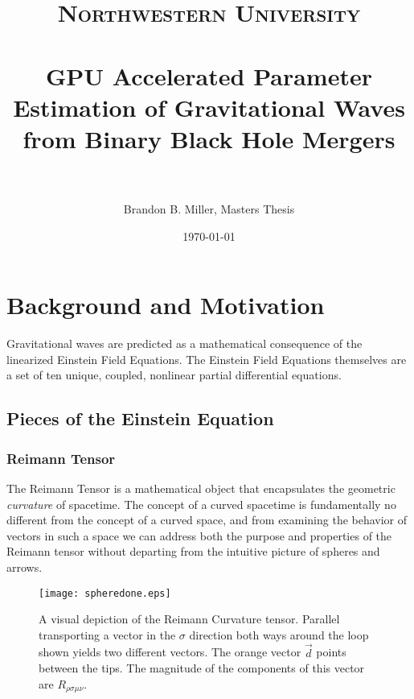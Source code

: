 \documentclass[paper=a4, fontsize=11pt]{scrartcl} %
\title{	
\normalfont \normalsize 
\textsc{Northwestern University} \\ [25pt] %
\horrule{0.5pt} \\[0.4cm] %
\huge GPU Accelerated Parameter Estimation of Gravitational Waves from Binary Black Hole Mergers \\ %
\horrule{2pt} \\[0.5cm] %
}
\author{Brandon B. Miller, Masters Thesis} %
\date{\normalsize\today} %
\numberwithin{equation}{section} %
\numberwithin{figure}{section} %
\numberwithin{table}{section} %
\begin{document}
\maketitle %
\newpage
\section{Background and Motivation}

Gravitational waves are predicted as a mathematical consequence of the linearized Einstein Field Equations. The Einstein Field Equations themselves are a set of ten unique, coupled, nonlinear partial differential equations.  

\subsection{Pieces of the Einstein Equation}
\subsubsection{Reimann Tensor}
The Reimann Tensor is a mathematical object that encapsulates the geometric \textit{curvature} of spacetime. The concept of a curved spacetime is fundamentally no different from the concept of a curved space, and from examining the behavior of vectors in such a space we can address both the purpose and properties of the Reimann tensor without departing from the intuitive picture of spheres and arrows.

\begin{figure}[h!]
\texttt{[image: spheredone.eps]}
\caption{A visual depiction of the Reimann Curvature tensor. Parallel transporting a vector in the $\sigma$ direction both ways around the loop shown yields two different vectors. The orange vector $\vec{d}$ points between the tips. The magnitude of the components of this vector are $R_{\rho \sigma \mu \nu}$.}
\label{fig:sphere}
\end{figure}
\end{document}
